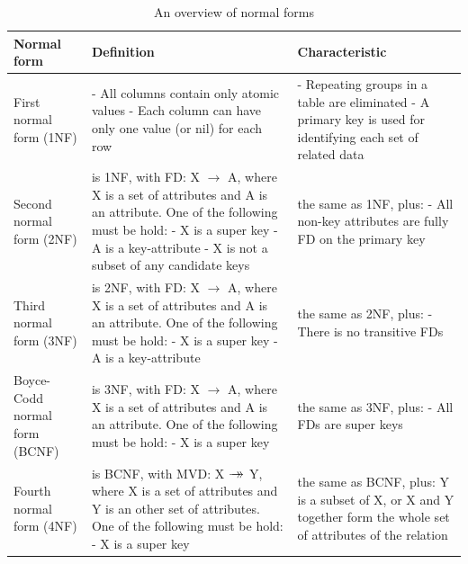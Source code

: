 \begin{table}
\begin{center}
\begin{tabular}{ |p{3cm}||p{5cm}|p{5cm}|  }
 \hline
 Normal form& Definition& Characteristic\\
 \hline
 First normal form (1NF)&- All columns contain only atomic values\newline
 - Each column can have only one value (or nil) for each row&- Repeating groups in a table are eliminated\newline
 - A primary key is used for identifying each set of related data\\
 \hline
 Second normal form (2NF)&is 1NF, with FD: X $\rightarrow$ A, where X is a set of attributes and A is an attribute. One of the following must be hold:\newline
 - X is a super key\newline
 - A is a key-attribute\newline
 - X is not a subset of any candidate keys&the same as 1NF, plus:\newline
 - All non-key attributes are fully FD on the primary key\\
 \hline
 Third normal form (3NF)&is 2NF, with FD: X $\rightarrow$ A, where X is a set of attributes and A is an attribute. One of the following must be hold:\newline
 - X is a super key\newline
 - A is a key-attribute&the same as 2NF, plus:\newline
 - There is no transitive FDs\\
 \hline
 Boyce-Codd normal form (BCNF)&is 3NF, with FD: X $\rightarrow$ A, where X is a set of attributes and A is an attribute. One of the following must be hold:\newline
 - X is a super key&the same as 3NF, plus:\newline
 - All FDs are super keys\\
 \hline
 Fourth normal form (4NF) &is BCNF, with MVD: X $\rightarrow\mathrel{\mkern-14mu}\rightarrow$ Y, where X is a set of attributes and Y is an other set of attributes. One of the following must be hold:\newline
 - X is a super key&the same as BCNF, plus:\newline
 Y is a subset of X, or X and Y together form the whole set of attributes of the relation\\
 \hline
\end{tabular}
\end{center}
\caption{An overview of normal forms}
\label{tab:FamousNF}
\end{table}

